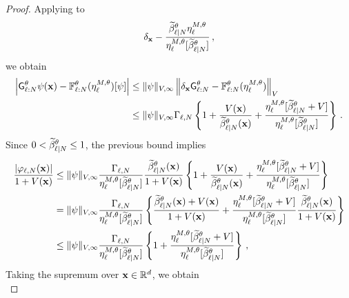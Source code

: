 \documentclass[11pt]{article}
\theoremstyle{plain}
\theoremstyle{definition}
\theoremstyle{remark}
\begin{document}
\begin{proof}
Applying   to
$$
\delta_\x - \frac{ \normbackwardfun{\ell}{N}[\theta]\eta_\ell^{M,\theta} }{ \eta_\ell^{M,\theta} [ \normbackwardfun{\ell}{N}[\theta] ] } \eqsp,
$$
we obtain
\begin{align*}
\left| \prodfsmk{\ell}{N}[\theta]\psi(\x) - \filtertransform{\ell:N}[\theta](\eta_\ell^{M,\theta})[\psi] \right| 
& \le \|\psi\|_{V,\infty}  \vnorm[ \delta_\x \prodfsmk{\ell}{N}[\theta]  - \filtertransform{\ell:N}[\theta](\eta_\ell^{M,\theta})][V]  \\
& \le \|\psi\|_{V,\infty} \Gamma_{\ell,N} \left\{ 1+ \frac{V(\x)}{\normbackwardfun{\ell}{N}[\theta](\x)} + \frac{ \eta_\ell^{M,\theta} [ \normbackwardfun{\ell}{N}[\theta]+V ] }{ \eta_\ell^{M,\theta} [ \normbackwardfun{\ell}{N}[\theta] ] } \right\} \eqsp.
\end{align*}
%
Since $0<\normbackwardfun{\ell}{N}[\theta]\le1$, the previous bound implies
\begin{align*}
\frac{ |\varphi_{\ell,N} (\x)| }{ 1+V(\x) }
&\le \|\psi\|_{V,\infty}
\frac{  \Gamma_{\ell,N}  }{ \eta_\ell^{M,\theta} [ \normbackwardfun{\ell}{N}[\theta] ] } 
\frac{ \normbackwardfun{\ell}{N}[\theta](\x) }{ 1+V(\x)} \left\{ 1+ \frac{V(\x)}{\normbackwardfun{\ell}{N}[\theta](\x)} + \frac{ \eta_\ell^{M,\theta} [ \normbackwardfun{\ell}{N}[\theta]+V ] }{ \eta_\ell^{M,\theta} [ \normbackwardfun{\ell}{N}[\theta] ] }  \right\} \\
&= \|\psi\|_{V,\infty}
\frac{ \Gamma_{\ell,N} }{\eta_\ell^{M,\theta}[\normbackwardfun{\ell}{N}[\theta]]}\left\{ \frac{ \normbackwardfun{\ell}{N}[\theta](\x)+V(\x)}{ 1+V(\x)} + \frac{ \eta_\ell^{M,\theta} [ \normbackwardfun{\ell}{N}[\theta]+V ] }{ \eta_\ell^{M,\theta} [ \normbackwardfun{\ell}{N}[\theta] ] }  \frac{ \normbackwardfun{\ell}{N}[\theta](\x) }{ 1+V(\x) } \right\} \\
&\le \|\psi\|_{V,\infty} \frac{ \Gamma_{\ell,N} }{\eta_\ell^{M,\theta}
[ \normbackwardfun{\ell}{N}[\theta] ] } \left\{ 1+ \frac{ \eta_\ell^{M,\theta} [ \normbackwardfun{\ell}{N}[\theta]+V ] }{ \eta_\ell^{M,\theta} [ \normbackwardfun{\ell}{N}[\theta] ] }  \right\} \eqsp,
\end{align*}
%
Taking the supremum over $\mathbf{x}\in\mathbb{R}^d$, we obtain
\begin{equation} \label{eq:bound_centered_function}

\end{equation}
\end{proof}
\end{document}
